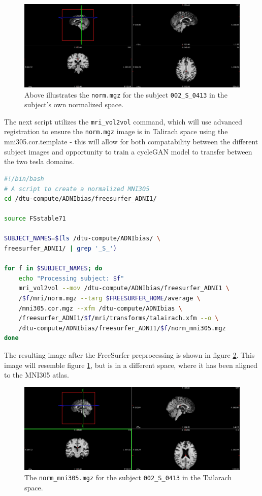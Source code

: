 \documentclass[12pt, fleqn, titlepage]{article}
\newcommand{\1}[1]{\mathds{1}\left[#1\right]}
\begin{document}
\begin{figure}[H]
	\centering
	\includegraphics[width=0.9\linewidth]{imgs/norm}
	\caption{Above illustrates the \texttt{norm.mgz} for the subject \texttt{002\_S\_0413} in the subject's own normalized space.} 
	\label{fig:norm}
\end{figure}

The next script utilizes the \texttt{mri\_vol2vol} command, which will use advanced registration to ensure the \texttt{norm.mgz} image is in Talirach space using the mni305.cor.template - this will allow for both compatability between the different subject images and opportunity to train a cycleGAN model to transfer between the two tesla domains.

\begin{lstlisting}[language=bash,caption={FreeSurfer mri\_vol2vol}]
#!/bin/bash 
# A script to create a normalized MNI305
cd /dtu-compute/ADNIbias/freesurfer_ADNI1/

source FSstable71

SUBJECT_NAMES=$(ls /dtu-compute/ADNIbias/ \ 
freesurfer_ADNI1/ | grep '_S_')

for f in $SUBJECT_NAMES; do 
	echo "Processing subject: $f"
	mri_vol2vol --mov /dtu-compute/ADNIbias/freesurfer_ADNI1 \
	/$f/mri/norm.mgz --targ $FREESURFER_HOME/average \
	/mni305.cor.mgz --xfm /dtu-compute/ADNIbias \ 
	/freesurfer_ADNI1/$f/mri/transforms/talairach.xfm --o \
	/dtu-compute/ADNIbias/freesurfer_ADNI1/$f/norm_mni305.mgz
done
\end{lstlisting}

\noindent
The resulting image after the FreeSurfer preprocessing is shown in figure \ref{fig:norm305}. This image will resemble figure \ref{fig:norm}, but is in a different space, where it has been aligned to the MNI305 atlas. 

\begin{figure}[H]
	\centering
	\includegraphics[width=0.7\linewidth]{imgs/norm_305}
	\caption{The \texttt{norm\_mni305.mgz} for the subject \texttt{002\_S\_0413} in the Tailarach space.} 
	\label{fig:norm305}
\end{figure}
\end{document}
